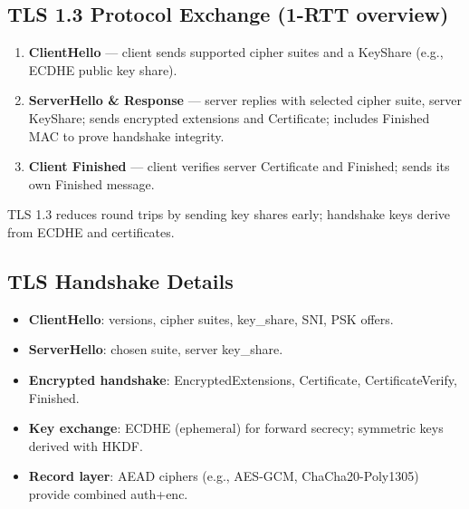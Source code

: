 \documentclass[11pt]{article}
\begin{document}
\subsection{TLS 1.3 Protocol Exchange (1-RTT overview)}
\begin{enumerate}
  \item \textbf{ClientHello} --- client sends supported cipher suites and a KeyShare (e.g., ECDHE public key share).
  \item \textbf{ServerHello \& Response} --- server replies with selected cipher suite, server KeyShare; sends encrypted extensions and Certificate; includes Finished MAC to prove handshake integrity.
  \item \textbf{Client Finished} --- client verifies server Certificate and Finished; sends its own Finished message.
\end{enumerate}

TLS 1.3 reduces round trips by sending key shares early; handshake keys derive from ECDHE and certificates.

\subsection{TLS Handshake Details}
\begin{itemize}
  \item \textbf{ClientHello}: versions, cipher suites, key\_share, SNI, PSK offers.
  \item \textbf{ServerHello}: chosen suite, server key\_share.
  \item \textbf{Encrypted handshake}: EncryptedExtensions, Certificate, CertificateVerify, Finished.
  \item \textbf{Key exchange}: ECDHE (ephemeral) for forward secrecy; symmetric keys derived with HKDF.
  \item \textbf{Record layer}: AEAD ciphers (e.g., AES-GCM, ChaCha20-Poly1305) provide combined auth+enc.
\end{itemize}
\end{document}
